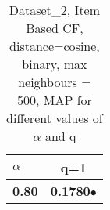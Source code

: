 \begin{table}
\begin{center}
\begin{tabular}{ | l || c |}
\hline
\textbf{$\alpha$} & \textbf{q=1} \\
\hline
\textbf{0.80} & \textbf{0.1780}$\bullet$\\
\hline
\end{tabular}
\caption{Dataset\_2, Item Based CF, distance=cosine, binary, max neighbours = 500, MAP for different values of $\alpha$ and q}
\label{table:MAP_Dataset_2_icf_cosine_binary_mnn=500}
\end{center}
\end{table}
